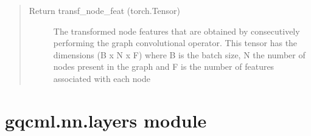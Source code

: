 \documentclass[letterpaper,10pt,english]{sphinxmanual}
\begin{document}
\begin{fulllineitems}
\begin{fulllineitems}
\begin{quote}
\begin{description}
\item[{Return transf\_node\_feat (torch.Tensor)}] \leavevmode
The transformed node features that are obtained by consecutively performing
the graph convolutional operator. This tensor has the dimensions (B x N x F)
where B is the batch size, N the number of nodes present in the graph and
F is the number of features associated with each node

\end{description}\end{quote}

\end{fulllineitems}


\end{fulllineitems}



\section{gqcml.nn.layers module}
\label{\detokenize{modules/gqcml.nn:module-gqcml.nn.layers}}\label{\detokenize{modules/gqcml.nn:gqcml-nn-layers-module}}
\end{document}
